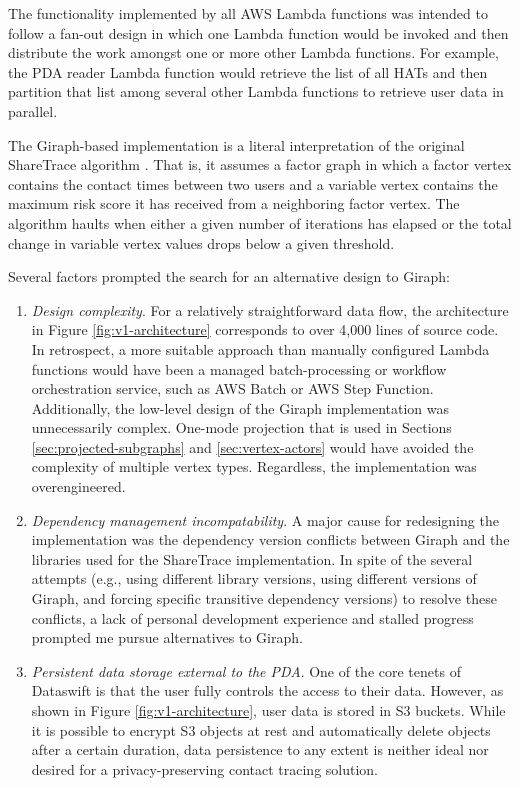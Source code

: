 The functionality implemented by all AWS Lambda functions was intended to follow a fan-out design in which one Lambda function would be invoked and then distribute the work amongst one or more other Lambda functions. For example, the PDA reader Lambda function would retrieve the list of all HATs and then partition that list among several other Lambda functions to retrieve user data in parallel.

The Giraph-based implementation is a literal interpretation of the original ShareTrace algorithm \cite{Ayday2021}. That is, it assumes a factor graph in which a factor vertex contains the contact times between two users and a variable vertex contains the maximum risk score it has received from a neighboring factor vertex. The algorithm haults when either a given number of iterations has elapsed or the total change in variable vertex values drops below a given threshold.

Several factors prompted the search for an alternative design to Giraph:
\begin{enumerate}
\item \emph{Design complexity}. For a relatively straightforward data flow, the architecture in Figure \ref{fig:v1-architecture} corresponds to over 4,000 lines of source code. In retrospect, a more suitable approach than manually configured Lambda  functions would have been a managed batch-processing or workflow orchestration service, such as AWS Batch or AWS Step Function. Additionally, the low-level design of the Giraph implementation was unnecessarily complex. One-mode projection that is used in Sections \ref{sec:projected-subgraphs} and \ref{sec:vertex-actors} would have avoided the complexity of multiple vertex types. Regardless, the implementation was overengineered.
\item \emph{Dependency management incompatability}. A major cause for redesigning the implementation was the dependency version conflicts between Giraph and the libraries used for the ShareTrace implementation. In spite of the several attempts (e.g., using different library versions, using different versions of Giraph, and forcing specific transitive dependency versions) to resolve these conflicts, a lack of personal development experience and stalled progress prompted me pursue alternatives to Giraph.
\item \emph{Persistent data storage external to the PDA}. One of the core tenets of Dataswift is that the user fully controls the access to their data. However, as shown in Figure \ref{fig:v1-architecture}, user data is stored in S3 buckets. While it is possible to encrypt S3 objects at rest and automatically delete objects after a certain duration, data persistence to any extent is neither ideal nor desired for a privacy-preserving contact tracing solution.
\end{enumerate}

